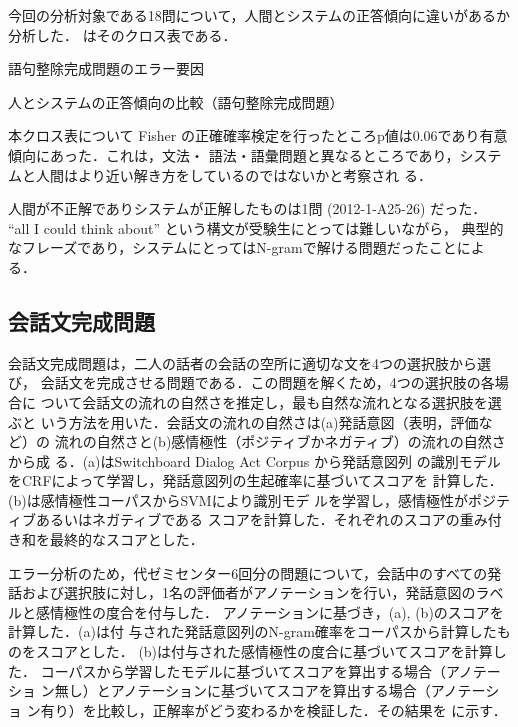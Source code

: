 \documentclass[japanese]{jnlp_1.4b}
\def\TABREF#1{}
\begin{document}
今回の分析対象である18問について，人間とシステムの正答傾向に違いがあるか分析した．
\TABREF{tab:eigo:cross:sort}はそのクロス表である．

\begin{table}[t]
\caption{語句整除完成問題のエラー要因}
\label{tab:eigo:error:sort}

\end{table}
\begin{table}[t]
\caption{人とシステムの正答傾向の比較（語句整除完成問題）}
\label{tab:eigo:cross:sort}

\end{table}

本クロス表について Fisher の正確確率検定を行ったところp値は0.06であり有意傾向にあった．これは，文法・
語法・語彙問題と異なるところであり，システムと人間はより近い解き方をしているのではないかと考察され
る．

人間が不正解でありシステムが正解したものは1問 (2012-1-A25-26) だった．
``all I could think about'' という構文が受験生にとっては難しいながら，
典型的なフレーズであり，システムにとってはN-gramで解ける問題だったことによる．


\subsection{会話文完成問題}
\label{sec:eigo:2b}

会話文完成問題は，二人の話者の会話の空所に適切な文を4つの選択肢から選び，
会話文を完成させる問題である．この問題を解くため，4つの選択肢の各場合に
ついて会話文の流れの自然さを推定し，最も自然な流れとなる選択肢を選ぶと
いう方法を用いた．会話文の流れの自然さは(a)発話意図（表明，評価など）の
流れの自然さと(b)感情極性（ポジティブかネガティブ）の流れの自然さから成
る．(a)はSwitchboard Dialog Act Corpus \cite{Jurafsky:97}から発話意図列
の識別モデルをCRFによって学習し，発話意図列の生起確率に基づいてスコアを
計算した．(b)は感情極性コーパス\cite{Pang+Lee:05a}からSVMにより識別モデ
ルを学習し，感情極性がポジティブあるいはネガティブである
スコアを計算した．それぞれのスコアの重み付き和を最終的なスコアとした．

エラー分析のため，代ゼミセンター6回分の問題について，会話中のすべての発
話および選択肢に対し，1名の評価者がアノテーションを行い，発話意図のラベ
ルと感情極性の度合を付与した．
アノテーションに基づき，(a), (b)のスコアを計算した．(a)は付
与された発話意図列のN-gram確率をコーパスから計算したものをスコアとした．
(b)は付与された感情極性の度合に基づいてスコアを計算した．
コーパスから学習したモデルに基づいてスコアを算出する場合（アノテーショ
ン無し）とアノテーションに基づいてスコアを算出する場合（アノテーショ
ン有り）を比較し，正解率がどう変わるかを検証した．その結果を
\TABREF{tab:eigo:2b}に示す．
\end{document}
